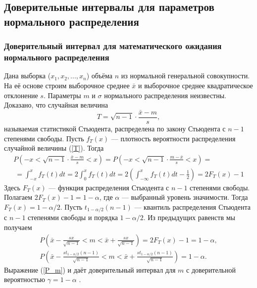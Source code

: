 \documentclass[../body.tex]{subfiles}
\begin{document}
\subsection{Доверительные интервалы для параметров нормального распределения}
\subsubsection{Доверительный интервал для математического ожидания нормального распределения}
Дана выборка ($x_{1},x_{2}, ... ,x_{n}$) объёма $n$ из нормальной генеральной совокупности. На её основе строим выборочное среднее $\bar{x}$ и выборочное среднее квадратическое отклонение $s$. Параметры $m$ и $\sigma$ нормального распределения неизвестны.
\newline
Доказано, что случайная величина
\begin{equation}
	T = \sqrt{n - 1}\cdot \frac{\bar{x} - m}{s},
	\label{T}
\end{equation}
называемая статистикой Стьюдента, распределена по закону Стьюдента с $n-1$ степенями свободы. Пусть $f_{T}(x)$ — плотность вероятности распределения случайной величины (\ref{T}). Тогда 
\begin{multline}
	P\left(-x < \sqrt{n - 1}\cdot\frac{\bar{x} - m}{s} < x \right) = 
	P\left(-x < \sqrt{n - 1}\cdot\frac{m - \bar{x}}{s} < x \right) = \\\
	= \int_{-x}^{x}{f_{T}(t)dt} = 2 \int_{0}^{x}{f_{T}(t)dt} = 
	2\left(  \int_{-\infty}^{x}{f_{T}(t)dt} - \frac{1}{2} \right) = 2F_{T}(x) - 1
	\label{P_f_t}
\end{multline}
Здесь $F_{T}(x)$ — функция распределения Стьюдента с $n-1$ степенями свободы.
\newline
Полагаем $2F_{T}(x)-1 = 1-\alpha$, где $\alpha$ — выбранный уровень значимости. Тогда $F_{T}(x) = 1-\alpha/2$. Пусть $t_{1-\alpha/2}(n−1)$ — квантиль распределения Стьюдента с $n-1$ степенями свободы и порядка $1-\alpha/2$. Из предыдущих равенств мы получаем 
\begin{equation}
	\begin{split}
		P\left(\bar{x} - \frac{sx}{\sqrt{n-1}} < m <  \bar{x} + \frac{sx}{\sqrt{n-1}}\right) = 2F_{T}(x) - 1 = 1 - \alpha,  \\
		P\left(\bar{x} - \frac{st_{1-\alpha/2}(n−1)}{\sqrt{n-1}} < m <  \bar{x} + \frac{st_{1-\alpha/2}(n−1)}{\sqrt{n-1}}\right)= 1 - \alpha.
		\label{P_m}
	\end{split}
\end{equation}
Выражение (\ref{P_m}) и даёт доверительный интервал для $m$ с доверительной вероятностью $\gamma = 1-\alpha$ \cite[c.~457-458]{max}.
\end{document}
